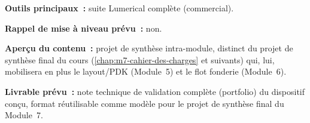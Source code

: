 \noindent\textbf{Outils principaux~:} suite Lumerical complète (commercial).

\noindent\textbf{Rappel de mise à niveau prévu~:} non.

\noindent\textbf{Aperçu du contenu~:} projet de synthèse intra-module, distinct du projet de synthèse final du cours (\cref{chap:m7-cahier-des-charges} et suivants) qui, lui, mobilisera en plus le layout/PDK (Module~5) et le flot fonderie (Module~6).

\noindent\textbf{Livrable prévu~:} note technique de validation complète (portfolio) du dispositif conçu, format réutilisable comme modèle pour le projet de synthèse final du Module~7.
